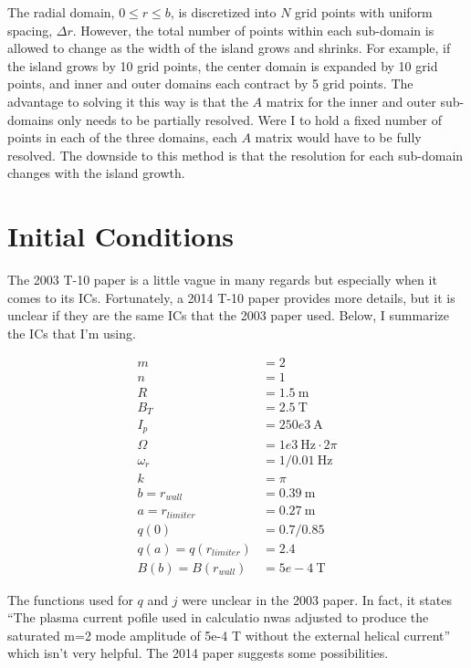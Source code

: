 \documentclass{article}
\begin{document}
The radial domain, $0 \leq r \leq b$, is discretized into $N$ grid points with uniform spacing, $\Delta r$.  However, the total number of points within each sub-domain is allowed to change as the width of the island grows and shrinks.  For example, if the island grows by 10 grid points, the center domain is expanded by 10 grid points, and inner and outer domains each contract by 5 grid points.  The advantage to solving it this way is that the $A$ matrix for the inner and outer sub-domains only needs to be partially resolved.  Were I to hold a fixed number of points in each of the three domains, each $A$ matrix would have to be fully resolved.  The downside to this method is that the resolution for each sub-domain changes with the island growth. 


\section{Initial Conditions}

The 2003 T-10 paper is a little vague in many regards but especially when it comes to its ICs.  Fortunately, a 2014 T-10 paper provides more details, but it is unclear if they are the same ICs that the 2003 paper used.  Below, I summarize the ICs that I'm using. 

\begin{equation} \label{ICConstants}
\begin{split}
m &= 2 \\
n &= 1 \\
R &= 1.5 \ \text{m}\\
B_T &= 2.5 \ \text{T} \\
I_p &= 250e3 \ \text{A}\\
\Omega & =1e3 \ \text{Hz} \cdot 2 \pi \\
\omega_r & = 1/0.01 \ \text{Hz} \\
k &= \pi \\
b = r_{wall} & = 0.39 \ \text{m} \\
a = r_{limiter} & = 0.27 \ \text{m} \\
q(0) &= 0.7/0.85 \\
q(a) = q(r_{limiter}) &= 2.4 \\
B(b) = B(r_{wall}) & = 5e-4 \ \text{T}
\end{split} 
\end{equation} 

The functions used for $q$ and $j$ were unclear in the 2003 paper.  In fact, it states ``The plasma current pofile used in calculatio nwas adjusted to produce the saturated m=2 mode amplitude of 5e-4 T without the external helical current'' which isn't very helpful.  The 2014 paper suggests some possibilities.  
\end{document}
